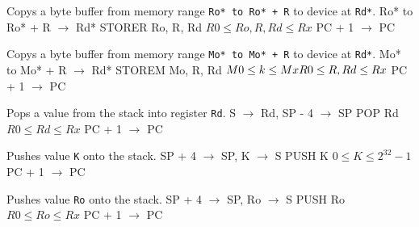 \documentclass[titlepage]{scrartcl}
\begin{document}
{Copys a byte buffer from memory range \texttt{Ro* to Ro* + R} to device at \texttt{Rd*}.}
{Ro* to Ro* + R $\rightarrow$ Rd*}
{STORER Ro, R, Rd}
{$R0 \leq Ro, R, Rd \leq Rx$}
{PC + 1 $\rightarrow$ PC}
{}
{\srtable{}{}{}{}}

{Copys a byte buffer from memory range \texttt{Mo* to Mo* + R} to device at \texttt{Rd*}.}
{Mo* to Mo* + R $\rightarrow$ Rd*}
{STOREM Mo, R, Rd}
{$M0 \leq k \leq Mx \hfill \break R0 \leq R, Rd \leq Rx$}
{PC + 1 $\rightarrow$ PC}
{}
{\srtable{}{}{}{}}

{Pops a value from the stack into register \texttt{Rd}.}
{S $\rightarrow$ Rd, SP - 4 $\rightarrow$ SP}
{POP Rd}
{$R0 \leq Rd \leq Rx$}
{PC + 1 $\rightarrow$ PC}
{}
{\srtable{}{}{}{}}

{Pushes value \texttt{K} onto the stack.}
{SP + 4 $\rightarrow$ SP, K $\rightarrow$ S}
{PUSH K}
{$0 \leq K \leq 2^{32} - 1$}
{PC + 1 $\rightarrow$ PC}
{}
{\srtable{}{}{}{}}

{Pushes value \texttt{Ro} onto the stack.}
{SP + 4 $\rightarrow$ SP, Ro $\rightarrow$ S}
{PUSH Ro}
{$R0 \leq Ro \leq Rx$}
{PC + 1 $\rightarrow$ PC}
{}
{\srtable{}{}{}{}}

\end{document}
